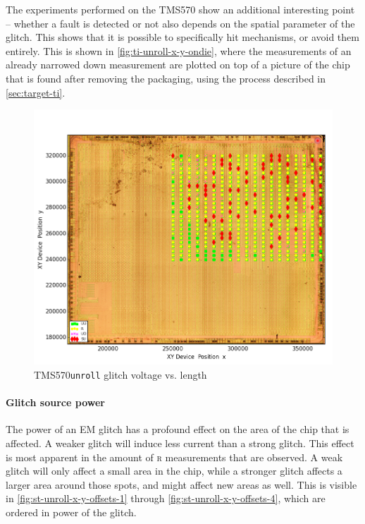 \documentclass[10pt]{article}
\newcommand{\TI}{TMS570\xspace}
\newcommand{\unroll}{\texttt{unroll}\xspace}
\newcommand{\R}{\textsc{r}\xspace}
\begin{document}
        The experiments performed on the \TI show an additional interesting point -- whether a fault is detected or not also depends on the spatial parameter of the glitch. This shows that it is possible to specifically hit mechanisms, or avoid them entirely. 
        This is shown in \autoref{fig:ti-unroll-x-y-ondie}, where the measurements of an already narrowed down measurement are plotted on top of a picture of the chip that is found after removing the packaging, using the process described in \autoref{sec:target-ti}.

        \begin{figure}[H]
          \centering
          \includegraphics[width=\textwidth]{../plots/newplots/ti-auth-x-y-ondie.png}
          \caption{\TI \unroll glitch voltage vs. length}
          \label{fig:ti-unroll-x-y-ondie}
        \end{figure}

      \paragraph*{Glitch source power}
        The power of an EM glitch has a profound effect on the area of the chip that is affected. A weaker glitch will induce less current than a strong glitch. This effect is most apparent in the amount of \R measurements that are observed. A weak glitch will only affect a small area in the chip, while a stronger glitch affects a larger area around those spots, and might affect new areas as well. This is visible in \autoref{fig:st-unroll-x-y-offsets-1} through \autoref{fig:st-unroll-x-y-offsets-4}, which are ordered in power of the glitch. 
\end{document}
